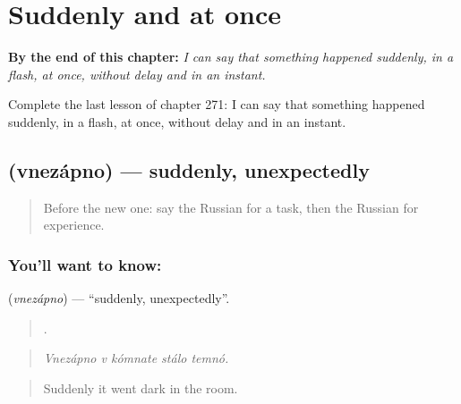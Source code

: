 
\chapter{Suddenly and at once}
\label{ch:ru-suddenly-and-at-once}

\begin{chapteropening}
\textbf{By the end of this chapter:} \emph{I can say that something happened suddenly, in a flash, at once, without delay and in an instant.}

Complete the last lesson of chapter 271: I can say that something happened suddenly, in a flash, at once, without delay and in an instant.
\end{chapteropening}

\section[\texorpdfstring{\ru{внезапно} (vnezápno)}{внезапно (vnezápno)}]{ (vnezápno) — suddenly, unexpectedly}

\label{lesson:RU-C271-vnezapno}



\begin{quote}
Before the new one: say the Russian for a task, then the Russian for experience.
\end{quote}

\subsection*{You'll want to know: }
\textbf{} (\emph{vnezápno}) — \textquotedblleft{}suddenly, unexpectedly\textquotedblright{}.

\begin{quote}
    .
\end{quote}

\begin{quote}
\emph{Vnezápno v kómnate stálo temnó.}
\end{quote}

\begin{quote}
Suddenly it went dark in the room.
\end{quote}

